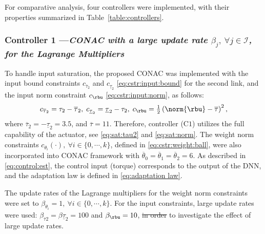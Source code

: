 \documentclass[letterpaper, journal]{IEEEtran}
\providecommand{\DIFadd}[1]{{\protect\color{blue}\uwave{#1}}} %
\providecommand{\DIFdel}[1]{{\protect\color{red}\sout{#1}}} %
\providecommand{\DIFaddbegin}{} %
\providecommand{\DIFaddend}{} %
\providecommand{\DIFdelbegin}{} %
\providecommand{\DIFdelend}{} %
\begin{document}
For comparative analysis, four controllers were implemented, with their properties summarized in Table~\ref{table:controllers}.

\subsubsection*{Controller 1 —\textit{CONAC with a large update rate $\beta_j,\ \forall j\in\mathcal{I}$, for the Lagrange Multipliers}}

To handle input saturation, the proposed CONAC was implemented with the input bound constraints $c_{\overline\tau_2}$ and $c_{\underline\tau_2}$ \eqref{eq:cstr:input:bound} for the second link, and the input norm constraint $c_{\rbu}$ \eqref{eq:cstr:input:norm}, as follows:
\begin{equation}
    c_{\overline\tau_2}     
    =
    \tau_2-\overline\tau_2
    ,
    \;
    c_{\underline\tau_2} 
    =
    \underline\tau_2-\tau_2
    ,
    \;
    c_{\rbu}
    =
    \tfrac{1}{2}
    \left(
        \norm{\rbu}-\overline\tau
    \right)^2 
    ,
    \label{eq:sim:cstr:CONAC}
\end{equation}
where $\overline\tau_2=-\underline{\tau}_2=3.5$, and $\overline\tau=11$.
Therefore, controller (C\DIFdelbegin \DIFdel{$1$}\DIFdelend \DIFaddbegin \DIFadd{$_1$}\DIFaddend ) utilizes the full capability of the actuator, see \eqref{eq:sat:tau2} and \eqref{eq:sat:norm}.
The weight norm constraints $c_{\theta_i}(\cdot),\ \forall i\in\{0,\cdots,k\}$, defined in \eqref{eq:cstr:weight:ball}, were also incorporated into \DIFaddbegin \DIFadd{the }\DIFaddend CONAC framework with $\overline\theta_0=\overline\theta_1=\overline\theta_2=6$.
As described in \eqref{eq:control:est}, the control input (torque) corresponds to the output of the DNN, and the adaptation law is defined in \eqref{eq:adaptation law}.

The update rates of the Lagrange multipliers for the weight norm constraints were set to $\beta_{\theta_i}=1,\ \forall i\in\{0,\cdots,k\}$.
For the input constraints, large update rates were used: \DIFdelbegin \DIFdel{$\beta_{\overline{\tau}2} = \beta{\underline{\tau}_2} = 100$ }\DIFdelend \DIFaddbegin \DIFadd{$\beta_{\overline{\tau}_2} = \beta_{\underline{\tau}_2} = 100$ }\DIFaddend and $\beta_{\rbu} = 10$, \DIFdelbegin \DIFdel{in order }\DIFdelend to investigate the effect of large update rates.
\end{document}
